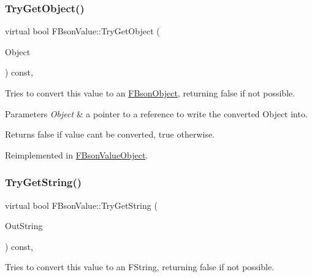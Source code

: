 \subsubsection{\texorpdfstring{Try\+Get\+Object()}{TryGetObject()}}
{\footnotesize\ttfamily virtual bool F\+Bson\+Value\+::\+Try\+Get\+Object (\begin{DoxyParamCaption}\item[{const T\+Shared\+Ptr$<$ \mbox{\hyperlink{class_f_bson_object}{F\+Bson\+Object}} $>$ $\ast$\&}]{Object }\end{DoxyParamCaption}) const\hspace{0.3cm}{\ttfamily [inline]}, {\ttfamily [virtual]}}

Tries to convert this value to an \mbox{\hyperlink{class_f_bson_object}{F\+Bson\+Object}}, returning false if not possible.


\begin{DoxyParams}{Parameters}
{\em Object} & a pointer to a reference to write the converted Object into. \\
\hline
\end{DoxyParams}
\begin{DoxyReturn}{Returns}
false if value can\textquotesingle{}t be converted, true otherwise. 
\end{DoxyReturn}


Reimplemented in \mbox{\hyperlink{class_f_bson_value_object_adf5ee6fb14cdfea399c4c25a4778a414}{F\+Bson\+Value\+Object}}.

\mbox{\label{class_f_bson_value_aa52379f3d911ed0d5c8ded6e83ceecc0}} 
\subsubsection{\texorpdfstring{Try\+Get\+String()}{TryGetString()}}
{\footnotesize\ttfamily virtual bool F\+Bson\+Value\+::\+Try\+Get\+String (\begin{DoxyParamCaption}\item[{F\+String \&}]{Out\+String }\end{DoxyParamCaption}) const\hspace{0.3cm}{\ttfamily [inline]}, {\ttfamily [virtual]}}

Tries to convert this value to an F\+String, returning false if not possible.


